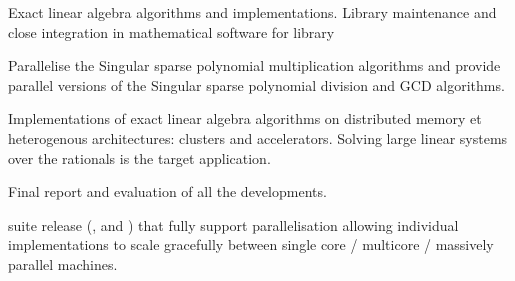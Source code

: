 \begin{workpackage}
\begin{wpdelivs}
  \begin{wpdeliv}[due=36,miles=hpc-prototype,id=LinBox-algo,dissem=PU,nature=DEM, lead=UJF,issue=110,status=delivered]
    {Exact linear algebra algorithms and implementations. Library maintenance and close integration
      in mathematical software for \Linbox library}
  \end{wpdeliv}
  \begin{wpdeliv}[due=48,miles=eval,id=singular-polyarith,dissem=PU,nature=DEM, lead=UK,issue=111,status=submitted]
      {Parallelise the Singular sparse polynomial multiplication algorithms and
        provide parallel versions of the Singular sparse polynomial division and GCD algorithms.}
\end{wpdeliv}
  \begin{wpdeliv}[due=48,miles=eval,id=LinBox-distributed,dissem=PU,nature=DEM, lead=UJF,issue=112,status=submitted]
    {Implementations of exact linear algebra algorithms on distributed memory et heterogenous
      architectures: clusters and accelerators. Solving large linear systems
      over the rationals is the target application.} 
  \end{wpdeliv}
  \begin{wpdeliv}[due=48,miles=eval,id=GAP-HPC-report,dissem=PU,nature=R,lead=SA,issue=113,status=submitted]
      {Final report and evaluation of all the \GAP developments.}
  \end{wpdeliv}
  \begin{wpdeliv}[due=48,id=pari-hpc2,dissem=PU,nature=DEM,lead=UB,issue=114,status=submitted]
  {\Pari suite release (\libpari, \GP and \GPtoC) that fully support parallelisation
   allowing individual implementations to scale gracefully between single
   core / multicore / massively parallel machines.}
  \end{wpdeliv}

\end{wpdelivs}
\end{workpackage}


